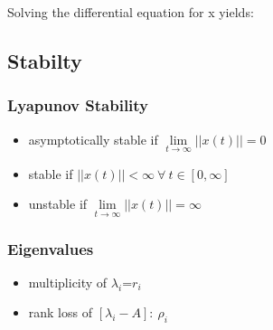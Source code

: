 \documentclass[10pt,a4paper]{scrartcl}
\begin{document}
\begin{multicols*}{3}

Solving the differential equation for x yields:


\subsection{Stabilty}

\subsubsection{Lyapunov Stability}

\begin{itemize}
\item asymptotically stable if $\lim\limits_{t\rightarrow\infty}||x(t)||=0$
\item stable if $||x(t)||<\infty\ \forall\ t\in[0,\infty]$
\item unstable if $\lim\limits_{t\rightarrow\infty}||x(t)||=\infty$
\end{itemize}

\subsubsection{Eigenvalues}





\begin{itemize}
\item multiplicity of $\lambda_i$=$r_i$
\item rank loss of $[\lambda_i-A]:\ \rho_i$
\end{itemize}


\end{multicols*}
\end{document}
